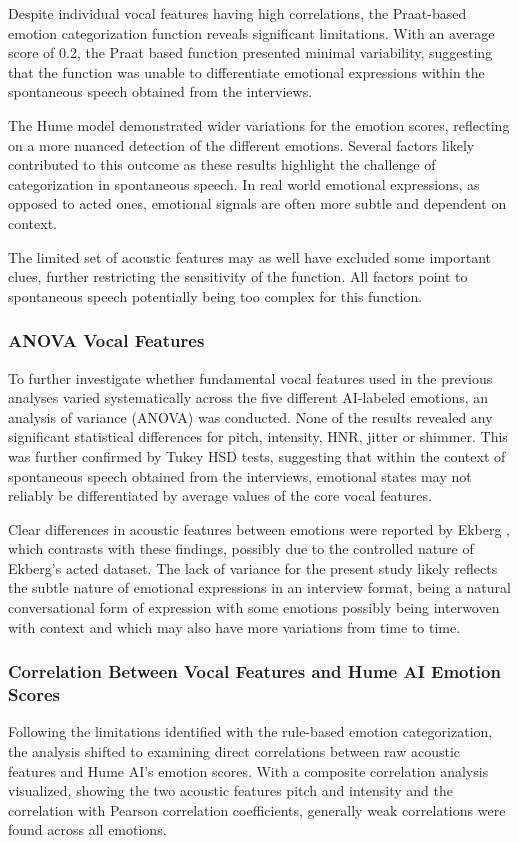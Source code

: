 Despite individual vocal features having high correlations, the Praat-based emotion categorization function reveals significant limitations. With an average score of 0.2, the Praat based function presented minimal variability, suggesting that the function was unable to differentiate emotional expressions within the spontaneous speech obtained from the interviews.

The Hume model demonstrated wider variations for the emotion scores, reflecting on a more nuanced detection of the different emotions. 
Several factors likely contributed to this outcome as these results highlight the challenge of categorization in spontaneous speech. In real world emotional expressions, as opposed to acted ones, emotional signals are often more subtle and dependent on context. 

The limited set of acoustic features may as well have excluded some important clues, further restricting the sensitivity of the function. All factors point to spontaneous speech potentially being too complex for this function.

\subsubsection{ANOVA Vocal Features}
To further investigate whether fundamental vocal features used in the previous analyses varied systematically across the five different AI-labeled emotions, an analysis of variance (ANOVA) was conducted. None of the results revealed any significant statistical differences for pitch, intensity, HNR, jitter or shimmer. This was further confirmed by Tukey HSD tests, suggesting that within the context of spontaneous speech obtained from the interviews, emotional states may not reliably be differentiated by average values of the core vocal features.

Clear differences in acoustic features between emotions were reported by Ekberg \autocite{Ekberg2023}, which contrasts with these findings, possibly due to the controlled nature of Ekberg’s acted dataset.
The lack of variance for the present study likely reflects the subtle nature of emotional expressions in an interview format, being a natural conversational form of expression with some emotions possibly being interwoven with context and which may also have more variations from time to time.

\subsubsection{Correlation Between Vocal Features and Hume AI Emotion Scores}
Following the limitations identified with the rule-based emotion categorization, the analysis shifted to examining direct correlations between raw acoustic features and Hume AI’s emotion scores. 
With a composite correlation analysis visualized, showing the two acoustic features pitch and intensity and the correlation with Pearson correlation coeﬀicients, generally weak correlations were found across all emotions. 

